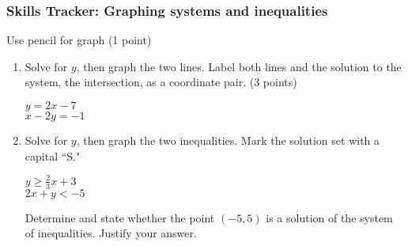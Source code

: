 \documentclass[12pt, twoside]{article}
\begin{document}
  \subsubsection*{Skills Tracker: Graphing systems and inequalities}
  Use pencil for graph (1 point)
    \begin{enumerate}

    \item Solve for $y$, then graph the two lines. Label both lines and the solution to the system, the intersection, as a coordinate pair. (3 points)

      \begin{multicols}{2}
        $y = 2x -7$ \\
        $x-2y = -1$
      \end{multicols}
      \vspace{3cm}

      \begin{center} %
      \end{center}

    \newpage
      \item Solve for $y$, then graph the two inequalities. Mark the solution set with a capital ``S."

        \begin{multicols}{2}
          $y \geq \frac{2}{3}x+3$ \\
          $2x+y < -5$
        \end{multicols}
        \vspace{3cm}

        \begin{center} %
        \end{center}
        Determine and state whether the point $(-5,5)$ is a solution of the system of inequalities. Justify your answer.



  \end{enumerate}
  \newpage
\end{document}

